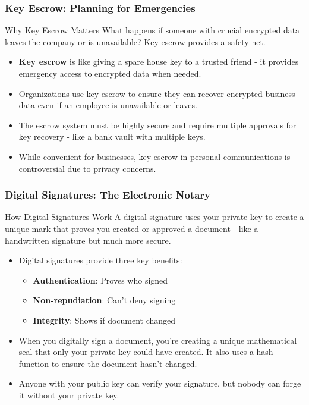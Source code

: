 \documentclass{beamer}
\begin{document}
\begin{frame}
    \frametitle{Key Escrow: Planning for Emergencies}
    
    \begin{alertblock}{Why Key Escrow Matters}
        What happens if someone with crucial encrypted data leaves the company or is unavailable? Key escrow provides a safety net.
    \end{alertblock}
    
    \begin{itemize}
        \item \textbf{Key escrow} is like giving a spare house key to a trusted friend - it provides emergency access to encrypted data when needed.
        
        \item Organizations use key escrow to ensure they can recover encrypted business data even if an employee is unavailable or leaves.
        
        \item The escrow system must be highly secure and require multiple approvals for key recovery - like a bank vault with multiple keys.
        
        \item While convenient for businesses, key escrow in personal communications is controversial due to privacy concerns.
    \end{itemize}
\end{frame}

\begin{frame}
    \frametitle{Digital Signatures: The Electronic Notary}
    
    \begin{block}{How Digital Signatures Work}
        A digital signature uses your private key to create a unique mark that proves you created or approved a document - like a handwritten signature but much more secure.
    \end{block}
    
    \begin{itemize}
        \item Digital signatures provide three key benefits:
            \begin{itemize}
                \item \textbf{Authentication}: Proves who signed
                \item \textbf{Non-repudiation}: Can't deny signing
                \item \textbf{Integrity}: Shows if document changed
            \end{itemize}
        
        \item When you digitally sign a document, you're creating a unique mathematical seal that only your private key could have created. It also uses a hash function to ensure the document hasn't changed.
        
        \item Anyone with your public key can verify your signature, but nobody can forge it without your private key.
    \end{itemize}
\end{frame}
\end{document}
